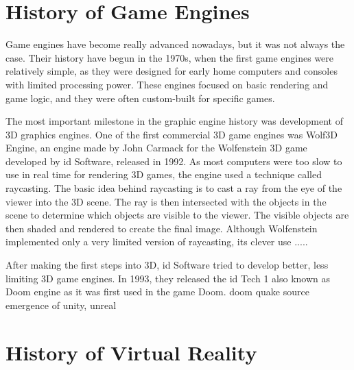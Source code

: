 \newpage
\section{History of Game Engines}
\label{sec:history_game_engines}
\hspace{\parindent}
Game engines have become really advanced nowadays, but it was not always the case. Their history have begun in the 1970s, when the first game engines were relatively simple, as they were designed for early home computers and consoles with limited processing power. These engines focused on basic rendering and game logic, and they were often custom-built for specific games.

The most important milestone in the graphic engine history was development of 3D graphics engines. One of the first commercial 3D game engines was Wolf3D Engine, an engine made by John Carmack for the Wolfenstein 3D game developed by id Software, released in 1992. As most computers were too slow to use in real time for rendering 3D games, the engine used a technique called raycasting. The basic idea behind raycasting is to cast a ray from the eye of the viewer into the 3D scene. The ray is then intersected with the objects in the scene to determine which objects are visible to the viewer. The visible objects are then shaded and rendered to create the final image. Although Wolfenstein implemented only a very limited version of raycasting, its clever use .....

After making the first steps into 3D, id Software tried to develop better, less limiting 3D game engines. In 1993, they released the id Tech 1 also known as Doom engine as it was first used in the game Doom.
doom
quake
source
emergence of unity, unreal

\newpage
\section{History of Virtual Reality}
\label{sec:history_vr}
\hspace{\parindent}